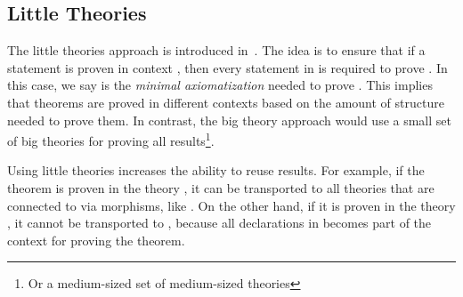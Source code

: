 
\subsection{Little Theories}
The little theories approach is introduced in~\cite{LittleTheories}. The idea is to ensure that if a statement  is proven in context \lstmath{$\Gamma$}, then every statement in \lstmath{$\Gamma$} is required to prove . In this case, we say \lstmath{$\Gamma$} is the \emph{minimal axiomatization} needed to prove . This implies that theorems are proved in different contexts based on the amount of structure needed to prove them. In contrast, the big theory approach would use a small set of big theories for proving all results\footnote{Or a medium-sized set of medium-sized theories}. 

Using little theories increases the ability to reuse results. For example, if the theorem  is proven in the theory , it can be transported to all theories that are connected to  via morphisms, like . On the other hand, if it is proven in the theory , it cannot be transported to , because all declarations in  becomes part of the context for proving the theorem.  

